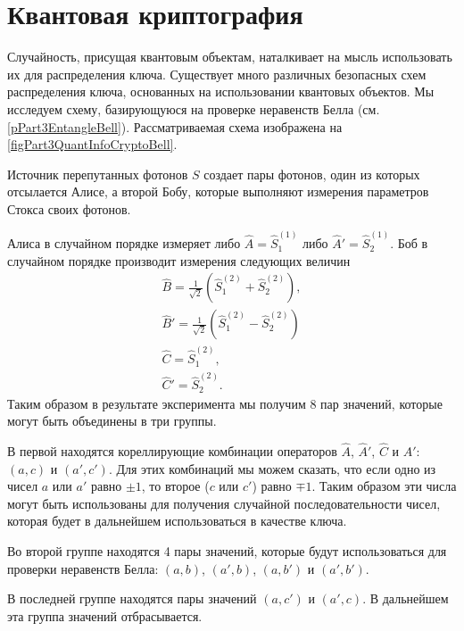\section{Квантовая криптография}
\label{subsecPart3QuantInfoQuantCrypto}
Случайность, присущая квантовым объектам, наталкивает на мысль
использовать их для распределения ключа. Существует много различных
безопасных схем распределения ключа, основанных на использовании
квантовых объектов. Мы исследуем схему, базирующуюся на проверке
неравенств Белла (см. \ref{pPart3EntangleBell}). Рассматриваемая схема
изображена на \autoref{figPart3QuantInfoCryptoBell}.



Источник перепутанных фотонов $S$ создает пары фотонов,
один из которых отсылается Алисе, а второй Бобу, которые выполняют
измерения параметров Стокса своих фотонов. 

Алиса в случайном порядке измеряет либо $\hat{A} = \hat{S}_1^{(1)}$
либо $\hat{A}' = \hat{S}_2^{(1)}$. Боб в случайном порядке производит
измерения следующих величин 
\begin{eqnarray}
\hat{B} = \frac{1}{\sqrt{2}}\left(\hat{S}_1^{(2)} +
  \hat{S}_2^{(2)}\right), 
\nonumber \\
\hat{B}' = \frac{1}{\sqrt{2}}\left(\hat{S}_1^{(2)} - \hat{S}_2^{(2)}\right)
\nonumber \\
\hat{C} = \hat{S}_1^{(2)},
\nonumber \\
\hat{C}' = \hat{S}_2^{(2)}.
\nonumber
\end{eqnarray}
Таким образом в результате эксперимента мы получим 8 пар значений,
которые могут быть объединены в три группы. 

В первой находятся
кореллирующие комбинации операторов $\hat{A}$, $\hat{A}'$, $\hat{C}$ и
$\hat{A}'$: $\left(a, c\right)$ и $\left(a', c'\right)$. Для этих
комбинаций мы можем сказать, что если одно из чисел $a$ или $a'$
равно $\pm 1$, то второе ($c$ или $c'$) равно $\mp 1$. Таким образом
эти числа могут быть использованы для получения случайной
последовательности чисел, которая будет в дальнейшем использоваться в
качестве ключа. 

Во второй группе находятся 4 пары значений, которые будут
использоваться для проверки неравенств Белла: $\left(a, b\right)$,
$\left(a', b\right)$, $\left(a, b'\right)$ и $\left(a', b'\right)$.

В последней группе находятся пары значений $\left(a, c'\right)$ и
$\left(a', c\right)$. В дальнейшем эта группа значений отбрасывается.

